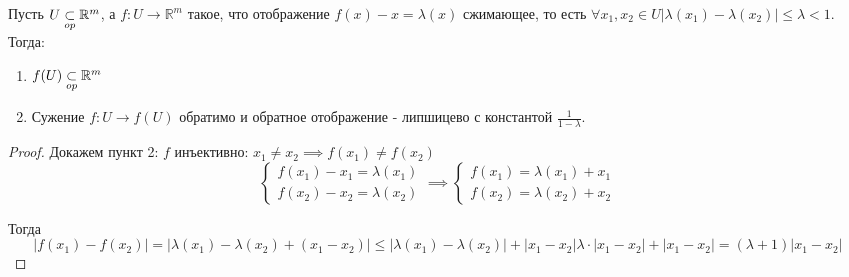 \begin{lemma*}
    Пусть $U \underset{op}{\subset} \mathbb{R}^m$, а $f:U \to \mathbb{R}^m$ такое, что отображение $f(x) - x = \lambda(x)$
    сжимающее, то есть $\forall x_1, x_2 \in U \left| \lambda(x_1) - \lambda(x_2) \right| \leq \lambda < 1$. Тогда:
    \begin{enumerate}
        \item $f(U) \underset{op}{\subset} \mathbb{R}^m$
        \item Сужение $f: U \to f(U)$ обратимо и обратное отображение - липшицево с константой $\frac{1}{1- \lambda}$.        
    \end{enumerate}

    \begin{proof}
        Докажем пункт 2:
        \newline
        $f$ инъективно: $x_1 \neq x_2 \implies f(x_1) \neq f(x_2)$
        \[\begin{cases}
            f(x_1) - x_1 = \lambda(x_1) \\
            f(x_2) - x_2 = \lambda(x_2) 
        \end{cases} \implies
        \begin{cases}
            f(x_1) = \lambda(x_1) + x_1 \\
            f(x_2) = \lambda(x_2) + x_2
        \end{cases}\]

        Тогда
        \[
            \left| f(x_1) - f(x_2) \right| = \left| \lambda(x_1) - \lambda(x_2) +  (x_1 - x_2) \right|
            \leq \left| \lambda(x_1) -\lambda(x_2) \right| + \left| x_1 - x_2 \right| 
            \lambda \cdot \left|x_1 - x_2 \right| + \left| x_1 - x_2 \right| = (\lambda + 1) \left| x_1 - x_2\right|
        \]


\end{proof}
\end{lemma*}
